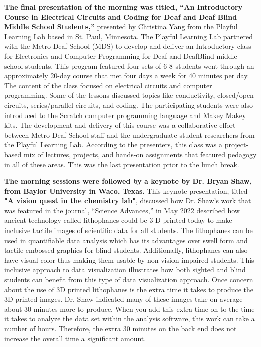 \documentclass[11.5pt]{sig-alternate}
\begin{document}
\begin{large}
\textbf{The final presentation of the morning was titled, “An Introductory Course in Electrical Circuits and Coding for Deaf and Deaf Blind Middle School Students,”} presented by Christina Yang from the Playful Learning Lab based in St. Paul, Minnesota. The Playful Learning Lab partnered with the Metro Deaf School (MDS) to develop and deliver an Introductory class for Electronics and Computer Programming for Deaf and DeafBlind middle school students. This program featured four sets of 6-8 students went through an approximately 20-day course that met four days a week for 40 minutes per day. The content of the class focused on electrical circuits and computer programming. Some of the lessons discussed topics like conductivity, closed/open circuits, series/parallel circuits, and coding. The participating students were also introduced to the Scratch computer programming language and Makey Makey kits. The development and delivery of this course was a collaborative effort between Metro Deaf School staff and the undergraduate student researchers from the Playful Learning Lab. According to the presenters,  this class was a project-based mix of lectures, projects, and hands-on assignments that featured pedagogy in all of these areas. This was the last presentation prior to the lunch break.

\textbf{The morning sessions were followed by a keynote by Dr. Bryan Shaw, from Baylor University in Waco, Texas.} This keynote presentation, titled \textbf{"A vision quest in the chemistry lab"}, discussed how Dr. Shaw’s work that was featured in the journal, “Science Advances,” in May 2022 described how ancient technology called lithophanes could be 3-D printed today to make inclusive tactile images of scientific data for all students. The lithophanes can be used in quantifiable data analysis which has its advantages over swell form and tactile embossed graphics for blind students. Additionally, lithophanes can also have visual color thus making them usable by non-vision impaired students. This inclusive approach to data visualization illustrates how both sighted and blind students can benefit from this type of data visualization approach. Once concern about the use of 3D printed lithophanes is the extra time it takes to produce the 3D printed images. Dr. Shaw indicated many of these images take on average about 30 minutes more to produce. When you add this extra time on to the time it takes to analyze the data set within the analysis software, this work can take a number of hours. Therefore, the extra 30 minutes on the back end does not increase the overall time a significant amount.


\end{large}
\end{document}
